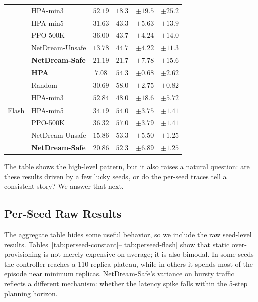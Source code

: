 \begin{table}[H]
\begin{tabular}{@{}llcccc@{}}
  & HPA-min3                 & $52.19$ & $18.3$ & $\pm19.5$ & $\pm25.2$ \\
  & HPA-min5                 & $31.63$ & $43.3$ & $\pm5.63$ & $\pm13.9$ \\
  & PPO-500K                 & $36.00$ & $43.7$ & $\pm4.24$ & $\pm14.0$ \\
  & NetDream-Unsafe          & $13.78$ & $44.7$ & $\pm4.22$ & $\pm11.3$ \\
  & \textbf{NetDream-Safe}   & $\mathbf{21.19}$ & $\mathbf{21.7}$ & $\pm7.78$ & $\pm15.6$ \\
\midrule
\multirow{7}{*}{Flash}
  & \textbf{HPA}             & $7.08$ & $54.3$ & $\pm0.68$ & $\pm2.62$ \\
  & Random                   & $30.69$ & $58.0$ & $\pm2.75$ & $\pm0.82$ \\
  & HPA-min3                 & $52.84$ & $48.0$ & $\pm18.6$ & $\pm5.72$ \\
  & HPA-min5                 & $34.19$ & $54.0$ & $\pm3.75$ & $\pm1.41$ \\
  & PPO-500K                 & $36.32$ & $57.0$ & $\pm3.79$ & $\pm1.41$ \\
  & NetDream-Unsafe          & $15.86$ & $53.3$ & $\pm5.50$ & $\pm1.25$ \\
  & \textbf{NetDream-Safe}   & $\mathbf{20.86}$ & $\mathbf{52.3}$ & $\pm6.89$ & $\pm1.25$ \\
\bottomrule
\end{tabular}
\end{table}

The table shows the high-level pattern, but it also raises a natural
question: are these results driven by a few lucky seeds, or do the
per-seed traces tell a consistent story?  We answer that next.

\subsection{Per-Seed Raw Results}
\label{app:per-seed}

The aggregate table hides some useful behavior, so we include the raw
seed-level results.  Tables~\ref{tab:perseed-constant}--\ref{tab:perseed-flash}
show that static over-provisioning is not merely expensive on average; it
is also bimodal.  In some seeds the controller reaches a 110-replica
plateau, while in others it spends most of the episode near minimum
replicas.  NetDream-Safe's variance on bursty traffic reflects a
different mechanism: whether the latency spike falls within the 5-step
planning horizon.

